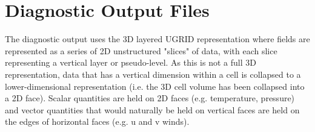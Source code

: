 \section{Diagnostic Output Files}








The diagnostic output uses the 3D layered UGRID representation \cite{ug3d} where fields are represented as a series 
of 2D unstructured "slices" of data, with each slice representing a vertical layer or pseudo-level. As this is not a full 3D representation, data that has a vertical dimension within a cell is collapsed to a lower-dimensional representation (i.e. the 3D cell volume has been collapsed into a 2D face). Scalar quantities 
are held on 2D faces (e.g. temperature, pressure) and vector quantities that would naturally be held on
vertical faces are held on the edges of horizontal faces (e.g. u and v winds).




